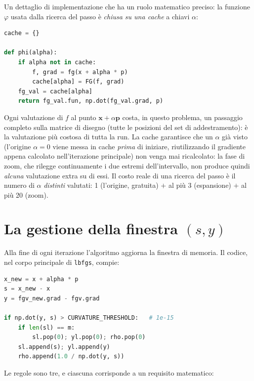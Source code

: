 Un dettaglio di implementazione che ha un ruolo matematico preciso: la
funzione $\varphi$ usata dalla ricerca del passo è \emph{chiusa su una
cache} a chiavi $\alpha$:
\begin{lstlisting}[language=python, caption={La cache per-$\alpha$ dentro
\texttt{\_strong\_wolfe\_line\_search}.}]
cache = {}

def phi(alpha):
    if alpha not in cache:
        f, grad = fg(x + alpha * p)
        cache[alpha] = FG(f, grad)
    fg_val = cache[alpha]
    return fg_val.fun, np.dot(fg_val.grad, p)
\end{lstlisting}
Ogni valutazione di $f$ al punto $\bm{x} + \alpha\bm{p}$ costa, in questo
problema, un passaggio completo sulla matrice di disegno (tutte le
posizioni del set di addestramento): è la valutazione più costosa di
tutta la run. La cache garantisce che un $\alpha$ già visto (l'origine
$\alpha = 0$ viene messa in cache \emph{prima} di iniziare, riutilizzando
il gradiente appena calcolato nell'iterazione principale) non venga mai
ricalcolato: la fase di zoom, che rilegge continuamente i due estremi
dell'intervallo, non produce quindi \emph{alcuna} valutazione extra su di
essi. Il costo reale di una ricerca del passo è il numero di $\alpha$
\emph{distinti} valutati: 1 (l'origine, gratuita) $+$ al più 3
(espansione) $+$ al più 20 (zoom).

\section{La gestione della finestra $(s, y)$}
\label{sec:lbfgs-history}

Alla fine di ogni iterazione l'algoritmo aggiorna la finestra di memoria.
Il codice, nel corpo principale di \texttt{lbfgs}, compie:

\begin{lstlisting}[language=python, caption={L'aggiornamento della finestra
di memoria, da \texttt{lbfgs}.}]
x_new = x + alpha * p
s = x_new - x
y = fgv_new.grad - fgv.grad

if np.dot(y, s) > CURVATURE_THRESHOLD:   # 1e-15
    if len(sl) == m:
        sl.pop(0); yl.pop(0); rho.pop(0)
    sl.append(s); yl.append(y)
    rho.append(1.0 / np.dot(y, s))
\end{lstlisting}

Le regole sono tre, e ciascuna corrisponde a un requisito matematico:

